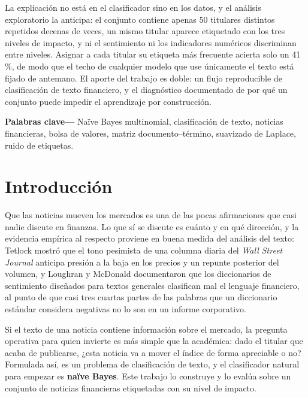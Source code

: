 \documentclass[11pt, a4paper]{article}
\begin{document}
\begin{center}
{{            La explicación no está en el clasificador sino en los datos, y el análisis exploratorio
            la anticipa: el conjunto contiene apenas 50 titulares distintos repetidos decenas de
            veces, un mismo titular aparece etiquetado con los tres niveles de impacto, y ni el
            sentimiento ni los indicadores numéricos discriminan entre niveles. Asignar a cada
            titular su etiqueta más frecuente acierta solo un 41\,\%, de modo que el techo de
            cualquier modelo que use únicamente el texto está fijado de antemano. El aporte del
            trabajo es doble: un flujo reproducible de clasificación de texto financiero, y el
            diagnóstico documentado de por qué un conjunto puede impedir el aprendizaje por
            construcción.
            \vspace{0.2cm}}}
    \vspace{0.4em}

    {\small\textbf{Palabras clave---} Naïve Bayes multinomial, clasificación de texto, noticias
    financieras, bolsa de valores, matriz documento--término, suavizado de Laplace, ruido de
    etiquetas.\par}
    \vspace{0.6em}
\end{center}

\section{Introducción}

Que las noticias mueven los mercados es una de las pocas afirmaciones que casi nadie discute en
finanzas. Lo que sí se discute es cuánto y en qué dirección, y la evidencia empírica al respecto
proviene en buena medida del análisis del texto: Tetlock \cite{tetlock2007} mostró que el tono
pesimista de una columna diaria del \textit{Wall Street Journal} anticipa presión a la baja en los
precios y un repunte posterior del volumen, y Loughran y McDonald \cite{loughran2011} documentaron
que los diccionarios de sentimiento diseñados para textos generales clasifican mal el lenguaje
financiero, al punto de que casi tres cuartas partes de las palabras que un diccionario estándar
considera negativas no lo son en un informe corporativo.

Si el texto de una noticia contiene información sobre el mercado, la pregunta operativa para
quien invierte es más simple que la académica: dado el titular que acaba de publicarse, ¿esta
noticia va a mover el índice de forma apreciable o no? Formulada así, es un problema de
clasificación de texto, y el clasificador natural para empezar es \textbf{naïve Bayes}. Este
trabajo lo construye y lo evalúa sobre un conjunto de noticias financieras etiquetadas con su
nivel de impacto.
\end{document}

